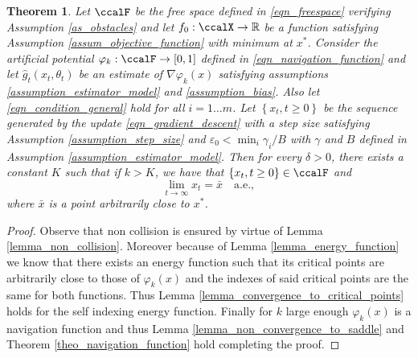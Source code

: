 \documentclass[article]{IEEEtran}
\newtheorem{theorem}{Theorem}
\theoremstyle{definition}
\begin{document}
%
%
\begin{theorem}\label{theo_biased}
Let $\ccalF$ be the free space defined in \eqref{eqn_freespace} verifying Assumption \ref{as_obstacles} and let $f_0:\ccalX \to \mathbb{R}$ be a function satisfying Assumption \ref{assum_objective_function} with minimum at $x^*$. Consider the artificial potential $\varphi_k:\ccalF\to[0,1]$ defined in \eqref{eqn_navigation_function} and let $\hat{g}_t(x_t,\theta_t)$ be an estimate of $\nabla \varphi_k(x)$ satisfying assumptions \ref{assumption_estimator_model} and \ref{assumption_bias}. Also let \eqref{eqn_condition_general} hold for all $i=1\ldots m$. Let $\left\{x_t, t\geq 0\right\}$ be the sequence generated by the update \eqref{eqn_gradient_descent} with a step size satisfying Assumption \ref{assumption_step_size} and $\varepsilon_0 <\min_i \gamma_i/B$ with $\gamma$ and $B$ defined in Assumption \ref{assumption_estimator_model}. Then for every $\delta>0$, there exists a constant $K$ such that if $k>K$, we have that  $\left\{x_t, t\geq0 \right\} \in \ccalF$ and 
%
\begin{equation}
\lim_{t\to \infty} x_t = \bar{x} \quad \mbox{a.e.},
\end{equation}
%
where $\bar{x}$ is a point arbitrarily close to $x^*$. 
\end{theorem}
%
\begin{proof}
Observe that non collision is ensured by virtue of Lemma \ref{lemma_non_collision}. Moreover because of Lemma \ref{lemma_energy_function} we know that there exists an energy function such that its critical points are arbitrarily close to those of $\varphi_k(x)$ and the indexes of said critical points are the same for both functions. Thus Lemma \ref{lemma_convergence_to_critical_points} holds for the self indexing energy function. Finally for $k$ large enough $\varphi_k(x)$ is a navigation function and thus Lemma \ref{lemma_non_convergence_to_saddle} and Theorem \ref{theo_navigation_function} hold completing the proof.
\end{proof}
\end{document}
